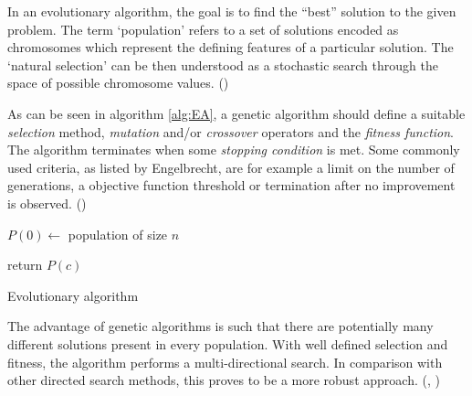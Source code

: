In an evolutionary algorithm, the goal is to find the ``best'' solution 
to the given problem. The term `population' refers to a set of solutions 
encoded as chromosomes which represent the defining features of a 
particular solution. The `natural selection' can be then understood 
as a stochastic search through the space of possible chromosome values. 
(\cite{Engelbrecht:2007:CII:1557464}) 


As can be seen in algorithm \ref{alg:EA}, a genetic algorithm should 
define a suitable \emph{selection} method, \emph{mutation} and/or 
\emph{crossover} operators and the \emph{fitness function}. 
The algorithm terminates when some \emph{stopping condition} is met. 
Some commonly used criteria, as listed by Engelbrecht, are for example 
a limit on the number of generations, a objective function threshold or
termination after no improvement is observed.
(\citep{Engelbrecht:2007:CII:1557464})


\begin{algorithm}
\DontPrintSemicolon
  \;
  $P(0) \longleftarrow$ population of size $n$

  \;
  return $P(c)$  
\caption{Evolutionary algorithm\label{alg:EA}}
\end{algorithm}

The advantage of genetic algorithms is such that there are potentially 
many different solutions present in every population. With well defined 
selection and fitness, the algorithm performs a multi-directional search. 
In comparison with other directed search methods, this proves to be a more 
robust approach. (\cite{Michalewicz:1996:GAD:229930}, 
\cite{Mitchell:1997:ML:541177}) %

